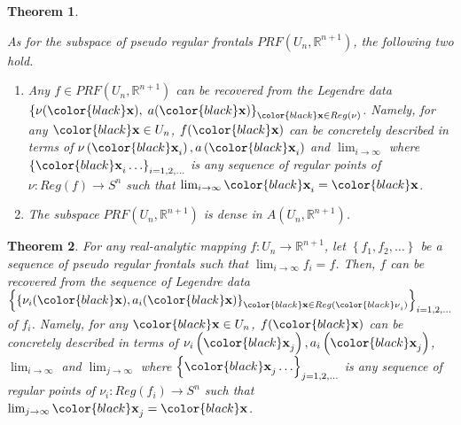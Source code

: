 \documentclass{amsart}
\newtheorem{theorem}{Theorem}
\theoremstyle{definition}
\theoremstyle{definition}
\theoremstyle{definition}
\begin{document}
\begin{theorem}\label{theorem2}
{\color{black} 
As for the subspace of pseudo regular frontals 
${PRF}\left(U_n, \mathbb{R}^{n+1}\right)$, the following two hold.   
\begin{enumerate}
\item[(1)] Any $f\in {PRF}\left(U_n, \mathbb{R}^{n+1}\right)$ 
can be recovered from the Legendre data 
$\left\{\nu({\color{black}\bf x}),\; 
a({\color{black}\bf x}) \right\}_{{\color{black}\bf x}\in Reg(\nu)}$.  
{\color{black} 
Namely, for any ${\color{black}\bf x}\in U_n$, 
$f({\color{black}\bf x})$ can be concretely described in terms of 
$\nu\left({\color{black}\bf x}_i\right), 
a\left({\color{black}\bf x}_i\right)$ and $\lim_{i\to \infty}$ where 
$\left\{{\color{black}\bf x}_i\ldots\right\}_{i=1, 2, \ldots}$ 
is any sequence of regular points of $\nu: Reg(f)\to S^n$ 
such that $\lim_{i\to \infty}{\color{black}\bf x}_i={\color{black}\bf x}$.     
}
\item[(2)] The subspace ${PRF}\left(U_n, \mathbb{R}^{n+1}\right)$ is dense 
in $A(U_n, \mathbb{R}^{n+1})$.   
\end{enumerate}
}
\end{theorem}
\begin{theorem}\label{theorem3}
For any {\color{black}real-analytic} mapping 
$f: U_n\to \mathbb{R}^{n+1}$, let 
$\left\{f_1, f_2, \ldots\right\}$ be a sequence of {pseudo regular} frontals 
such that $\lim_{i\to \infty}{f_i}=f$.    Then, $f$ can be recovered from the 
sequence of Legendre data 
$ 
\left\{
\left\{
\nu_i({\color{black}\bf x}), a_i({\color{black}\bf x})
\right\}_{{\color{black}\bf x}\in Reg({\color{black}\nu}_i)}
\right\}_{i=1, 2, \ldots}$ of $f_i$.       
{\color{black} 
Namely, for any ${\color{black}\bf x}\in U_n$, 
$f({\color{black}\bf x})$ can be concretely described in terms of 
$\nu_i\left({\color{black}\bf x}_j\right), 
a_i\left({\color{black}\bf x}_j\right)$, $\lim_{i\to \infty}$ and 
$\lim_{j\to \infty}$ where 
$\left\{{\color{black}\bf x}_j\ldots\right\}_{j=1, 2, \ldots}$ 
is any sequence of regular points of $\nu_i: Reg(f_i)\to S^n$ 
such that $\lim_{j\to \infty}{\color{black}\bf x}_j={\color{black}\bf x}$.     
}
\end{theorem}
\end{document}
